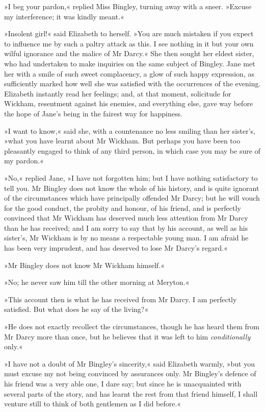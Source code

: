 »I beg your pardon,« replied Miss Bingley, turning away with a sneer. »Excuse my interference; it was kindly meant.«

»Insolent girl!« said Elizabeth to herself. »You are much mistaken if you expect to influence me by such a paltry attack as this. I see nothing in it but your own wilful ignorance and the malice of Mr Darcy.« She then sought her eldest sister, who had undertaken to make inquiries on the same subject of Bingley. Jane met her with a smile of such sweet complacency, a glow of such happy expression, as sufficiently marked how well she was satisfied with the occurrences of the evening. Elizabeth instantly read her feelings; and, at that moment, solicitude for Wickham, resentment against his enemies, and everything else, gave way before the hope of Jane's being in the fairest way for happiness.

»I want to know,« said she, with a countenance no less smiling than her sister's, »what you have learnt about Mr Wickham. But perhaps you have been too pleasantly engaged to think of any third person, in which case you may be sure of my pardon.«

»No,« replied Jane, »I have not forgotten him; but I have nothing satisfactory to tell you. Mr Bingley does not know the whole of his history, and is quite ignorant of the circumstances which have principally offended Mr Darcy; but he will vouch for the good conduct, the probity and honour, of his friend, and is perfectly convinced that Mr Wickham has deserved much less attention from Mr Darcy than he has received; and I am sorry to say that by his account, as well as his sister's, Mr Wickham is by no means a respectable young man. I am afraid he has been very imprudent, and has deserved to lose Mr Darcy's regard.«

»Mr Bingley does not know Mr Wickham himself.«

»No; he never saw him till the other morning at Meryton.«

»This account then is what he has received from Mr Darcy. I am perfectly satisfied. But what does he say of the living?«

»He does not exactly recollect the circumstances, though he has heard them from Mr Darcy more than once, but he believes that it was left to him \textit{conditionally} only.«

»I have not a doubt of Mr Bingley's sincerity,« said Elizabeth warmly, »but you must excuse my not being convinced by assurances only. Mr Bingley's defence of his friend was a very able one, I dare say; but since he is unacquainted with several parts of the story, and has learnt the rest from that friend himself, I shall venture still to think of both gentlemen as I did before.«

